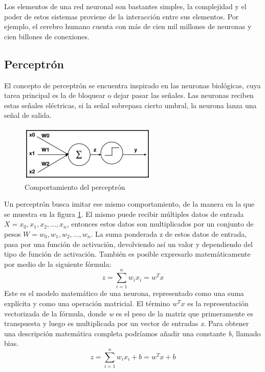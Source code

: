 Los elementos de una red neuronal son bastantes simples, la complejidad y el poder de estos sistemas proviene de la interacción entre sus elementos. Por ejemplo, el cerebro humano cuenta  con más de cien mil millones de neuronas y cien billones de conexiones.

\subsection{Perceptrón}
El concepto de perceptrón se encuentra inspirado en las neuronas biológicas, cuya tarea principal es la de bloquear o dejar pasar las señales. Las neuronas reciben estas señales eléctricas, si la señal sobrepasa cierto umbral, la neurona lanza una señal de salida. \\
\begin{figure}[H]
    \centering
    \includegraphics{capitulos/img/perceptron.png}
    \caption{Comportamiento del perceptrón}
    \label{fig:perceptron}
\end{figure}
Un perceptrón busca imitar ese mismo comportamiento, de la manera en la que se muestra en la figura \ref{fig:perceptron}. El mismo puede recibir múltiples datos de entrada \(X = {x_{0},x_{1},x_{2},...,x_{n}}\), entonces estos datos son multiplicados por un conjunto de pesos \(W = {w_{0},w_{1},w_{2},...,w_{n}}\). La suma ponderada z de estos datos de entrada, pasa por una función de activación, devolviendo así un valor y dependiendo del tipo de función de activación. También es posible expresarlo matemáticamente por medio de la siguiente fórmula: 
\begin{equation}
z = \sum_{i=1}^{n} w_{i} x_{i} = w^{T}x
\end{equation}
Este es el modelo matemático de una neurona, representado como una suma explícita y como una operación matricial. El término \(w^{T}x\)  es la representación vectorizada de la fórmula, donde \textit{w} es el peso de la matriz que primeramente es transpuesta y luego es multiplicada por un vector de entradas \textit{x}. Para obtener una descripción matemática completa podríamos añadir una constante \textit{b}, llamado bias.
\begin{equation}
z = \sum_{i=1}^{n} w_{i} x_{i} + b = w^{T}x + b
\end{equation}
